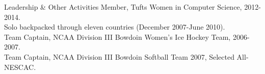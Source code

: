 \documentclass{resume} %
\begin{document}
\begin{rSection}{Leadership \& Other Activities}
Member, Tufts Women in Computer Science, 2012-2014. \\
Solo backpacked through eleven countries (December 2007-June 2010). \\
Team Captain, NCAA Division III Bowdoin Women's Ice Hockey Team, 2006-2007.\\
Team Captain, NCAA Division III Bowdoin Softball Team 2007, Selected
All-NESCAC.\\
\end{rSection}








\end{document}
